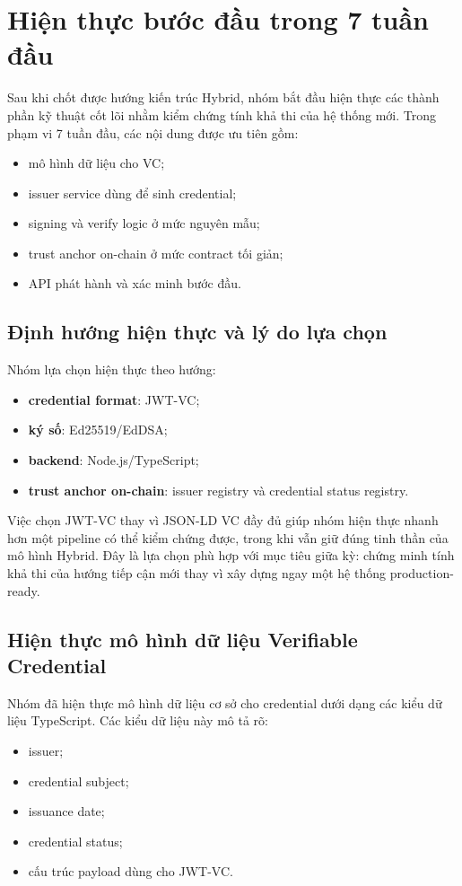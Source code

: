 \section{Hiện thực bước đầu trong 7 tuần đầu}

Sau khi chốt được hướng kiến trúc Hybrid, nhóm bắt đầu hiện thực các thành phần kỹ thuật cốt lõi nhằm kiểm chứng tính khả thi của hệ thống mới. Trong phạm vi 7 tuần đầu, các nội dung được ưu tiên gồm:
\begin{itemize}
    \item mô hình dữ liệu cho VC;
    \item issuer service dùng để sinh credential;
    \item signing và verify logic ở mức nguyên mẫu;
    \item trust anchor on-chain ở mức contract tối giản;
    \item API phát hành và xác minh bước đầu.
\end{itemize}

\subsection{Định hướng hiện thực và lý do lựa chọn}

Nhóm lựa chọn hiện thực theo hướng:
\begin{itemize}
    \item \textbf{credential format}: JWT-VC;
    \item \textbf{ký số}: Ed25519/EdDSA;
    \item \textbf{backend}: Node.js/TypeScript;
    \item \textbf{trust anchor on-chain}: issuer registry và credential status registry.
\end{itemize}

Việc chọn JWT-VC thay vì JSON-LD VC đầy đủ giúp nhóm hiện thực nhanh hơn một pipeline có thể kiểm chứng được, trong khi vẫn giữ đúng tinh thần của mô hình Hybrid. Đây là lựa chọn phù hợp với mục tiêu giữa kỳ: chứng minh tính khả thi của hướng tiếp cận mới thay vì xây dựng ngay một hệ thống production-ready.

\subsection{Hiện thực mô hình dữ liệu Verifiable Credential}

Nhóm đã hiện thực mô hình dữ liệu cơ sở cho credential dưới dạng các kiểu dữ liệu TypeScript. Các kiểu dữ liệu này mô tả rõ:
\begin{itemize}
    \item issuer;
    \item credential subject;
    \item issuance date;
    \item credential status;
    \item cấu trúc payload dùng cho JWT-VC.
\end{itemize}

